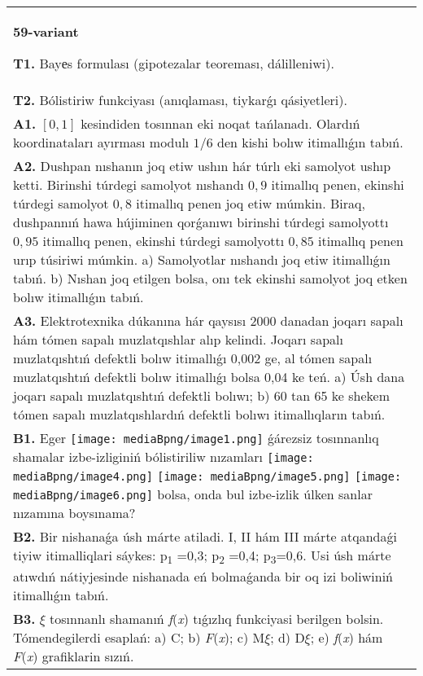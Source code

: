 \documentclass{article}
\begin{document}
\begin{tabular}{m{17cm}}
\textbf{59-variant}
\newline

\textbf{T1.} Bayеs formulası (gipotezalar teoreması, dálilleniwi).
 \\
\textbf{T2.} Bólistiriw funkciyası (anıqlaması, tiykarǵı qásiyetleri).
 \\
\textbf{A1.} $\left[ 0,1 \right]$ kesindiden tosınnan eki noqat tańlanadı. Olardıń koordinataları ayırması modulı $1/6$ den kishi bolıw itimallıǵın tabıń.
 \\
\textbf{A2.} Dushpan nıshanın joq etiw ushın hár túrlı eki samolyot ushıp ketti. Birinshi túrdegi samolyot nıshandı $0,9$ itimallıq penen, ekinshi túrdegi samolyot $0,8$ itimallıq penen joq etiw múmkin. Biraq, dushpannıń hawa hújiminen qorǵanıwı birinshi túrdegi samolyottı $0,95$ itimallıq penen, ekinshi túrdegi samolyottı $0,85$ itimallıq penen urıp túsiriwi múmkin. a) Samolyotlar nıshandı joq etiw itimallıǵın tabıń. b) Nıshan joq etilgen bolsa, onı tek ekinshi samolyot joq etken bolıw itimallıǵın tabıń.
 \\
\textbf{A3.} Elektrotexnika dúkanına hár qaysısı 2000 danadan joqarı sapalı hám tómen sapalı muzlatqıshlar alıp kelindi. Joqarı sapalı muzlatqıshtıń defektli bolıw itimallıǵı 0,002 ge, al tómen sapalı muzlatqıshtıń defektli bolıw itimallıǵı bolsa 0,04 ke teń. a) Úsh dana joqarı sapalı muzlatqıshtıń defektli bolıwı; b) 60 tan 65 ke shekem tómen sapalı muzlatqıshlardıń defektli bolıwı itimallıqların tabıń.
 \\
\textbf{B1.} Eger \texttt{[image: mediaBpng/image1.png]} ǵárezsiz tosınnanlıq shamalar izbe-izliginiń bólistiriliw nızamları
\texttt{[image: mediaBpng/image4.png]} \texttt{[image: mediaBpng/image5.png]} \texttt{[image: mediaBpng/image6.png]}
bolsa, onda bul izbe-izlik úlken sanlar nızamına boysınama?
 \\
\textbf{B2.} Bir nishanaǵa úsh márte atiladi. I, II hám III márte atqandaǵi tiyiw itimalliqlari sáykes: p\textsubscript{1} =0,3; p\textsubscript{2} =0,4; p\textsubscript{3}=0,6. Usi úsh márte atıwdıń nátiyjesinde nishanada eń bolmaǵanda bir oq izi boliwiniń itimallıǵın tabıń.
 \\
\textbf{B3.} $\xi$ tosınnanlı shamanıń \emph{f}(\emph{x}) tıǵızlıq funkciyasi berilgen bolsin. Tómendegilerdi esaplań: a) C; b) \emph{F}(\emph{x}); c) M$\xi$; d) D$\xi$; e) \emph{f}(\emph{x}) hám \emph{F}(\emph{x}) grafiklarin sızıń.\(f(x) = \left\{ \begin{matrix}

\end{matrix}
\end{tabular}
\end{document}
